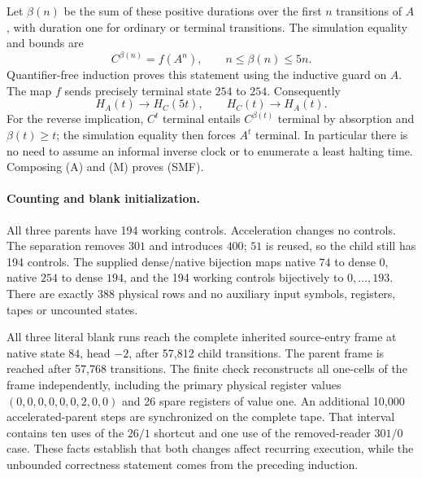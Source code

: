 Let $\beta(n)$ be the sum of these positive durations over the first
$n$ transitions of $A$, with duration one for ordinary or terminal
transitions.  The simulation equality and bounds are
\[
 C^{\beta(n)}=f(A^n),\qquad n\le\beta(n)\le5n.
\]
Quantifier-free induction proves this statement using the inductive guard
on $A$.  The map $f$ sends precisely terminal state $254$ to $254$.
Consequently
\[
 H_A(t)\to H_C(5t),\qquad H_C(t)\to H_A(t).
 \tag{M}
\]
For the reverse implication, $C^t$ terminal entails
$C^{\beta(t)}$ terminal by absorption and $\beta(t)\ge t$;
the simulation equality then forces $A^t$ terminal.  In particular there
is no need to assume an informal inverse clock or to enumerate a least
halting time.  Composing (A) and (M) proves (SMF).

\paragraph{Counting and blank initialization.}
All three parents have 194 working controls.  Acceleration changes no controls.
The separation removes $301$ and introduces $400$; $51$ is reused, so the
child still has 194 controls.  The supplied dense/native bijection maps
native $74$ to dense $0$, native $254$ to dense $194$, and the 194 working
controls bijectively to $0,\ldots,193$.  There are exactly 388 physical
rows and no auxiliary input symbols, registers, tapes or uncounted states.

All three literal blank runs reach the complete inherited source-entry frame at
native state $84$, head $-2$, after 57,812 child transitions.  The parent
frame is reached after 57,768 transitions.  The finite check reconstructs
all one-cells of the frame independently, including the primary physical
register values $(0,0,0,0,0,0,2,0,0)$ and 26 spare registers of value one.
An additional 10,000 accelerated-parent steps are synchronized on the
complete tape.  That interval contains ten uses of the $26/1$ shortcut
and one use of the removed-reader $301/0$ case.  These facts establish
that both changes affect recurring execution, while the unbounded
correctness statement comes from the preceding induction.

